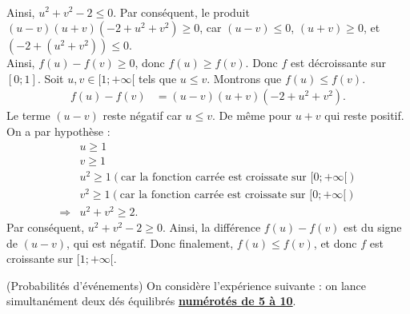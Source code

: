 \documentclass[12pt,
addpoints,
fleqn
]{exam}
\begin{document}
\begin{questions}
\begin{solution}
\begin{parts}
\begin{subparts}
\begin{align*}
                \end{align*}
                Ainsi, $u^2+v^2 - 2 \leq 0$. Par conséquent, le produit $(u-v)(u+v)(-2+ u^2 + v^2) \geq 0$, car $(u-v)\leq 0$, $(u+v)\geq 0$, et $(-2 + (u^2 +v^2)) \leq 0$.\\
                Ainsi, $f(u)-f(v) \geq 0$, donc $f(u)\geq f(v)$. Donc $f$ est décroissante sur $[0;1]$.
                \subpart Soit $u,v \in [1;+\infty[$ tels que $u \leq v$. Montrons que $f(u) \leq f(v)$.\\
                \begin{align*}
                    f(u)-f(v) & = (u-v)(u+v)(-2+u^2+v^2).
                \end{align*}
                Le terme $(u-v)$ reste négatif car $u\leq v$. De même pour $u+v$ qui reste positif.\\
                On a par hypothèse :
                \begin{align*}
                                & u \geq 1                                                                   \\
                                & v \geq 1                                                                   \\
                                & u^2 \geq 1 (\text{car la fonction carrée est croissate sur $[0;+\infty[$}) \\
                                & v^2\geq 1 (\text{car la fonction carrée est croissate sur $[0;+\infty[$})  \\
                    \Rightarrow & u^2 + v^2 \geq 2.
                \end{align*}
                Par conséquent, $u^2+v^2 -2 \geq 0$. Ainsi, la différence $f(u)-f(v)$ est du signe de $(u-v)$, qui est négatif.
                Donc finalement, $f(u)\leq f(v)$, et donc $f$ est croissante sur $[1;+\infty[$.


            \end{subparts}


        \end{parts}

    \end{solution}




    \question (Probabilités d'événements)
    On considère l'expérience suivante : on lance simultanément deux dés équilibrés \underline{\textbf{numérotés de 5 à 10}}.
\end{questions}
\end{document}
